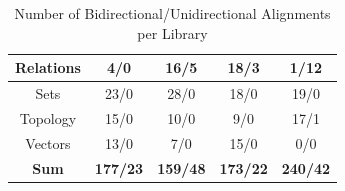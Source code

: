 \begin{table}[ht]
\begin{tabular}{|c|c|c|c|c|}
		\hline \textsf{Relations}  & \textsf{4/0} & \textsf{16/5} & \textsf{18/3} & \textsf{1/12}\\
		\hline \textsf{Sets}  & \textsf{23/0} & \textsf{28/0} & \textsf{18/0} & \textsf{19/0}\\
		\hline \textsf{Topology} & \textsf{15/0} & \textsf{10/0} & \textsf{9/0}& \textsf{17/1} \\
		\hline \textsf{Vectors} & \textsf{13/0} & \textsf{7/0} & \textsf{15/0}& \textsf{0/0} \\
		\hline \textbf{Sum}  & \textbf{177/23} & \textbf{159/48} & \textbf{173/22}& \textbf{240/42} \\ 
		\hline 
	\end{tabular}
	\caption{Number of Bidirectional/Unidirectional Alignments per Library}\label{tbl:alignmenttotal}
\end{table}


